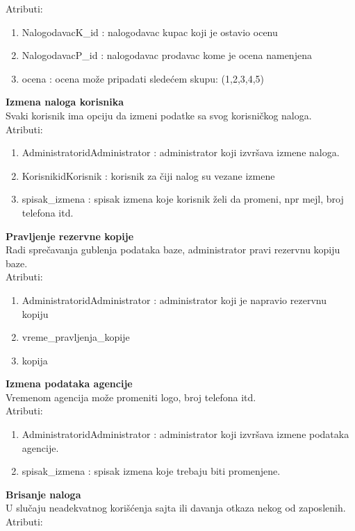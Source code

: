 \documentclass[20pt]{article}
\begin{document}
\indent Atributi:
\begin{enumerate}
        \item  NalogodavacK\_id : nalogodavac kupac koji je ostavio ocenu
        \item  NalogodavacP\_id : nalogodavac prodavac kome je ocena namenjena
        \item  ocena : ocena mo\v {z}e pripadati slede\' cem skupu: (1,2,3,4,5)
\end{enumerate}
\newpage
{\bfseries Izmena naloga korisnika}\\
Svaki korisnik ima opciju da izmeni podatke sa svog korisni\v {c}kog naloga.\\
\indent Atributi:
\begin{enumerate}
        \item  AdministratoridAdministrator : administrator koji izvr\v {s}ava izmene naloga.
        \item  KorisnikidKorisnik : korisnik za \v {c}iji nalog su vezane izmene
        \item  spisak\_izmena : spisak izmena koje korisnik \v {z}eli da promeni, npr mejl, broj telefona itd.
\end{enumerate}
{\bfseries Pravljenje rezervne kopije}\\
Radi spre\v {c}avanja gublenja podataka baze, administrator pravi rezervnu kopiju baze.\\
\indent Atributi:
\begin{enumerate}
        \item  AdministratoridAdministrator : administrator koji je napravio rezervnu kopiju 
        \item  vreme\_pravljenja\_kopije
        \item  kopija
\end{enumerate}
{\bfseries Izmena podataka agencije}\\
Vremenom agencija mo\v {z}e promeniti logo, broj telefona itd.\\
\indent Atributi:
\begin{enumerate}
        \item  AdministratoridAdministrator : administrator koji izvr\v {s}ava izmene podataka agencije.
        \item  spisak\_izmena : spisak izmena koje trebaju biti promenjene.
\end{enumerate}
{\bfseries Brisanje naloga}\\
U slu\v {c}aju neadekvatnog kori\v {s}\' cenja sajta ili davanja otkaza nekog od zaposlenih.
\indent Atributi:
\end{document}
